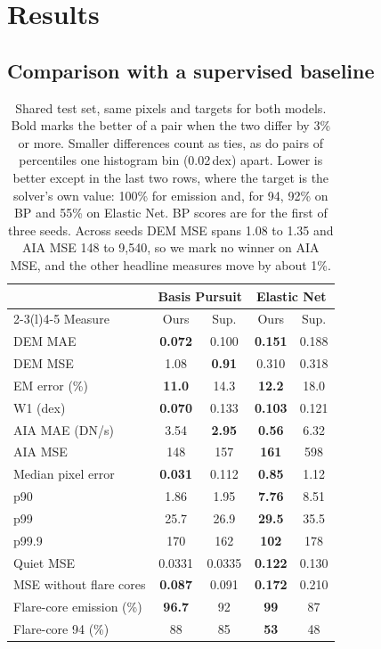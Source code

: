 \section{Results}
\label{sec:results}

\subsection{Comparison with a supervised baseline}
\label{sec:comparison}

\begin{table}[t]
\centering
\small
\caption{Shared test set, same pixels and targets for both models. Bold marks the better of a pair when the two differ by 3\% or more. Smaller differences count as ties, as do pairs of percentiles one histogram bin (0.02\,dex) apart. Lower is better except in the last two rows, where the target is the solver's own value: 100\% for emission and, for 94\Ang, 92\% on BP and 55\% on Elastic Net. BP scores are for the first of three seeds. Across seeds DEM MSE spans 1.08 to 1.35 and AIA MSE 148 to 9,540, so we mark no winner on AIA MSE, and the other headline measures move by about 1\%.}
\label{tab:headline}
\begin{tabular}{@{}lcccc@{}}
\toprule
 & \multicolumn{2}{c}{Basis Pursuit} & \multicolumn{2}{c}{Elastic Net}\\
\cmidrule(lr){2-3}\cmidrule(l){4-5}
Measure & Ours & Sup. & Ours & Sup.\\
\midrule
DEM MAE & \textbf{0.072} & 0.100 & \textbf{0.151} & 0.188\\
DEM MSE & 1.08 & \textbf{0.91} & 0.310 & 0.318\\
EM error (\%) & \textbf{11.0} & 14.3 & \textbf{12.2} & 18.0\\
W1 (dex) & \textbf{0.070} & 0.133 & \textbf{0.103} & 0.121\\
AIA MAE (DN/s) & 3.54 & \textbf{2.95} & \textbf{0.56} & 6.32\\
AIA MSE & 148 & 157 & \textbf{161} & 598\\
\midrule
Median pixel error & \textbf{0.031} & 0.112 & \textbf{0.85} & 1.12\\
p90 & 1.86 & 1.95 & \textbf{7.76} & 8.51\\
p99 & 25.7 & 26.9 & \textbf{29.5} & 35.5\\
p99.9 & 170 & 162 & \textbf{102} & 178\\
\midrule
Quiet MSE & 0.0331 & 0.0335 & \textbf{0.122} & 0.130\\
MSE without flare cores & \textbf{0.087} & 0.091 & \textbf{0.172} & 0.210\\
Flare-core emission (\%) & \textbf{96.7} & 92 & \textbf{99} & 87\\
Flare-core 94\Ang{} (\%) & 88 & 85 & \textbf{53} & 48\\
\bottomrule
\end{tabular}
\end{table}

